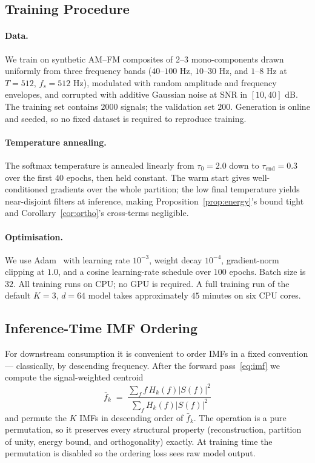 \documentclass[journal]{IEEEtran}
\theoremstyle{remark}
\begin{document}
\subsection{Training Procedure}
\label{subsec:training}

\paragraph{Data.}
We train on synthetic AM--FM composites of 2--3 mono-components drawn
uniformly from three frequency bands ($40$--$100$ Hz, $10$--$30$ Hz,
and $1$--$8$ Hz at $T=512$, $f_{s}=512$ Hz), modulated with random
amplitude and frequency envelopes, and corrupted with additive Gaussian
noise at SNR in $[10, 40]$ dB. The training set contains $2000$
signals; the validation set $200$. Generation is online and seeded, so
no fixed dataset is required to reproduce training.

\paragraph{Temperature annealing.}
The softmax temperature is annealed linearly from $\tau_{0} = 2.0$ down
to $\tau_{\mathrm{end}} = 0.3$ over the first $40$ epochs, then held
constant. The warm start gives well-conditioned gradients over the
whole partition; the low final temperature yields near-disjoint filters
at inference, making Proposition~\ref{prop:energy}'s bound tight and
Corollary~\ref{cor:ortho}'s cross-terms negligible.

\paragraph{Optimisation.}
We use Adam~\cite{kingma2015adam} with learning rate $10^{-3}$, weight
decay $10^{-4}$, gradient-norm clipping at $1.0$, and a cosine
learning-rate schedule over $100$ epochs. Batch size is $32$. All
training runs on CPU; no GPU is required. A full training run of the
default $K=3$, $d=64$ model takes approximately $45$ minutes on six
CPU cores.

\subsection{Inference-Time IMF Ordering}
\label{subsec:sort}

For downstream consumption it is convenient to order IMFs in a fixed
convention --- classically, by descending frequency. After the forward
pass~\eqref{eq:imf} we compute the signal-weighted centroid
\begin{equation}
\bar{f}_{k} \;=\;
\frac{\sum_{f} f\,H_{k}(f)\lvert S(f)\rvert^{2}}
      {\sum_{f} H_{k}(f)\lvert S(f)\rvert^{2}}
\end{equation}
and permute the $K$ IMFs in descending order of $\bar{f}_{k}$. The
operation is a pure permutation, so it preserves every structural
property (reconstruction, partition of unity, energy bound, and
orthogonality) exactly. At training time the permutation is disabled so
the ordering loss sees raw model output.
\end{document}
